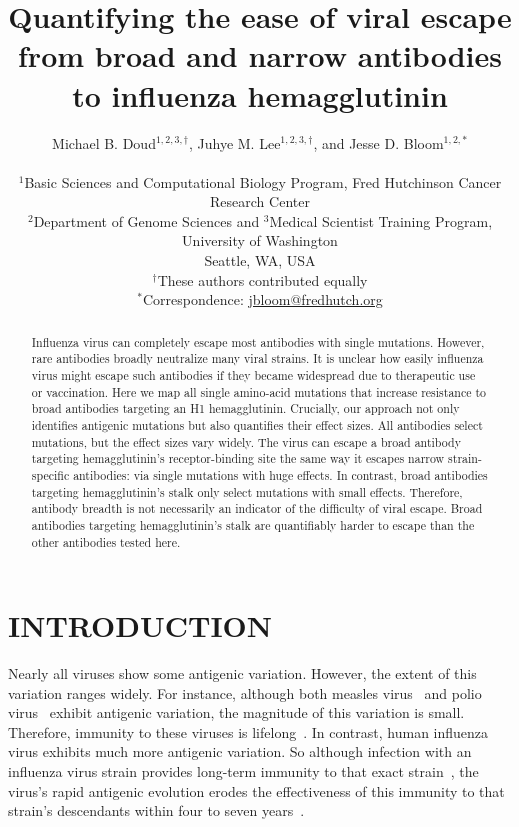 \documentclass[11pt]{article}
\title{Quantifying the ease of viral escape from broad and narrow antibodies to influenza hemagglutinin}
\author
{Michael B. Doud$^{1,2,3,\dagger}$, Juhye M. Lee$^{1,2,3,\dagger}$, and Jesse D. Bloom$^{1,2,*}$\\
\\
\scriptsize{$^1$Basic Sciences and Computational Biology Program, Fred Hutchinson Cancer Research Center}\\
\scriptsize{$^2$Department of Genome Sciences and $^3$Medical Scientist Training Program, University of Washington} \\
\scriptsize{Seattle, WA, USA} \\
\scriptsize{$^{\dagger}$These authors contributed equally} \\
\scriptsize{$^*$Correspondence: \href{jbloom@fredhutch.org}{jbloom@fredhutch.org}}
}
\date{}
\begin{document}
\maketitle
\onehalfspacing

\begin{abstract}
Influenza virus can completely escape most antibodies with single mutations.
However, rare antibodies broadly neutralize many viral strains.
It is unclear how easily influenza virus might escape such antibodies if they became widespread due to therapeutic use or vaccination.
Here we map all single amino-acid mutations that increase resistance to broad antibodies targeting an H1 hemagglutinin.
Crucially, our approach not only identifies antigenic mutations but also quantifies their effect sizes.
All antibodies select mutations, but the effect sizes vary widely. 
The virus can escape a broad antibody targeting hemagglutinin's receptor-binding site the same way it escapes narrow strain-specific antibodies: via single mutations with huge effects.   
In contrast, broad antibodies targeting hemagglutinin's stalk only select mutations with small effects. 
Therefore, antibody breadth is not necessarily an indicator of the difficulty of viral escape.
Broad antibodies targeting hemagglutinin's stalk are quantifiably harder to escape than the other antibodies tested here.
\end{abstract}

\section*{INTRODUCTION}
Nearly all viruses show some antigenic variation.
However, the extent of this variation ranges widely.
For instance, although both measles virus~\citep{birrer1981antigenic,ter1981antigenic} and polio virus~\citep{crainic1983natural,diamond1985antigenic,drexler2014robustness} exhibit antigenic variation, the magnitude of this variation is small. 
Therefore, immunity to these viruses is lifelong~\citep{panum1847iagttagelser,salk1984one}.
In contrast, human influenza virus exhibits much more antigenic variation.
So although infection with an influenza virus strain provides long-term immunity to that exact strain~\citep{fluinboardingschool1978,davies1982christ,yu2008neutralizing}, the virus's rapid antigenic evolution erodes the effectiveness of this immunity to that strain's descendants within four to seven years~\citep{couch1983immunity}.
\end{document}
